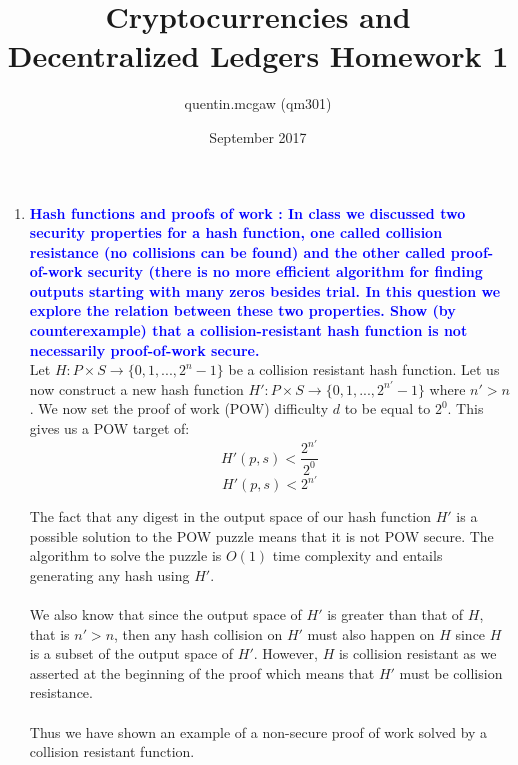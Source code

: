 \documentclass[11pt]{article}
\title{Cryptocurrencies and Decentralized Ledgers Homework 1}
\author{quentin.mcgaw (qm301)}
\date{September 2017}
\begin{document}
\maketitle

\begin{enumerate}

\item \textbf{\textcolor{blue}{Hash functions and proofs of work : In class we discussed two security properties for a hash function, one called collision resistance (no collisions can be found) and the other called proof-of-work security (there is no more efficient algorithm for finding outputs starting with many zeros besides trial. In this question we explore the relation between these two properties. Show (by counterexample) that a collision-resistant hash function is not necessarily proof-of-work secure.}}
\\ Let $H:P \times S \rightarrow \{0, 1,...,2^n - 1\}$ be a collision resistant hash function. Let us now construct a new hash function $H':P \times S \rightarrow \{0, 1,...,2^{n'} - 1\}$ where $n' > n$. We now set the proof of work (POW) difficulty $d$ to be equal to $2^0$. This gives us a POW target of:
\\

$$H'(p, s) < \frac{2^{n'}}{2^0} $$
$$H'(p, s) < 2^{n'}$$

The fact that any digest in the output space of our hash function $H'$ is a possible solution to the POW puzzle means that it is not POW secure. The algorithm to solve the puzzle is $O(1)$ time complexity and entails generating any hash using $H'$.
\\\\ We also know that since the output space of $H'$ is greater than that of $H$, that is $n' > n$, then any hash collision on $H'$ must also happen on $H$ since $H$ is a subset of the output space of $H'$. However, $H$ is collision resistant as we asserted at the beginning of the proof which means that $H'$ must be collision resistance.
\\\\ Thus we have shown an example of a non-secure proof of work solved by a collision resistant function.


\end{enumerate}
\end{document}
